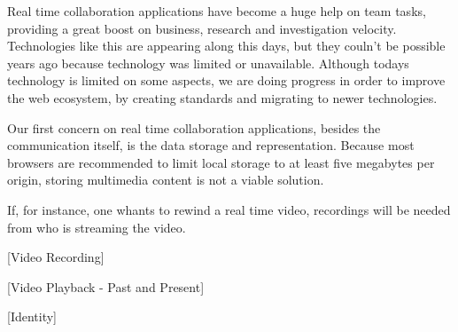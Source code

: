 
  Real time collaboration applications have become a huge help on team tasks, providing a great boost on business, research and investigation velocity. Technologies like this are appearing along this days, but they couln't be possible years ago because technology was limited or unavailable. Although todays technology is limited on some aspects, we are doing progress in order to improve the web ecosystem, by creating standards and migrating to newer technologies.

  Our first concern on real time collaboration applications, besides the communication itself, is the data storage and representation. Because most browsers are recommended to limit local storage to at least five megabytes per origin, storing multimedia content is not a viable solution.

  If, for instance, one whants to rewind a real time video, recordings will be needed from who is streaming the video. 

  {\color{red}[Video Recording]}

  {\color{red}[Video Playback - Past and Present]}

  {\color{red}[Identity]}



